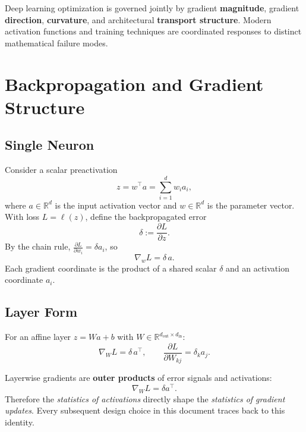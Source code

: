 \documentclass[12pt,a4paper]{article}
\theoremstyle{definition}
\theoremstyle{remark}
\newcommand{\R}{\mathbb{R}}
\begin{document}
\begin{keybox}
Deep learning optimization is governed jointly by gradient \textbf{magnitude}, gradient \textbf{direction}, \textbf{curvature}, and architectural \textbf{transport structure}. Modern activation functions and training techniques are coordinated responses to distinct mathematical failure modes.
\end{keybox}

\section{Backpropagation and Gradient Structure}

\subsection{Single Neuron}

Consider a scalar preactivation
\[
z = w^\top a = \sum_{i=1}^d w_i a_i,
\]
where $a \in \R^d$ is the input activation vector and $w \in \R^d$ is the parameter vector. With loss $L = \ell(z)$, define the backpropagated error
\[
\delta := \frac{\partial L}{\partial z}.
\]
By the chain rule, $\frac{\partial L}{\partial w_i} = \delta a_i$, so
\[
\boxed{\nabla_w L = \delta\, a.}
\]
Each gradient coordinate is the product of a shared scalar $\delta$ and an activation coordinate $a_i$.

\subsection{Layer Form}

For an affine layer $z = Wa + b$ with $W \in \R^{d_{\text{out}} \times d_{\text{in}}}$:
\[
\nabla_W L = \delta\, a^\top, \qquad \frac{\partial L}{\partial W_{kj}} = \delta_k a_j.
\]

\begin{keybox}
Layerwise gradients are \textbf{outer products} of error signals and activations:
\[
\nabla_W L = \delta a^\top.
\]
Therefore the \emph{statistics of activations} directly shape the \emph{statistics of gradient updates}. Every subsequent design choice in this document traces back to this identity.
\end{keybox}

\end{document}
